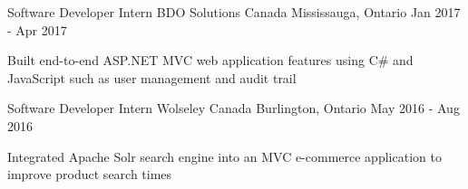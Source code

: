 \begin{cventries}
  \cventry
    {Software Developer Intern} %
    {BDO Solutions Canada} %
    {Mississauga, Ontario} %
    {Jan 2017 - Apr 2017} %
    {
      \begin{cvitems} %
        \item {Built end-to-end ASP.NET MVC web application features using C\# and JavaScript such as user management and audit trail}
      \end{cvitems}
    }

  \cventry
    {Software Developer Intern} %
    {Wolseley Canada} %
    {Burlington, Ontario} %
    {May 2016 - Aug 2016} %
    {
      \begin{cvitems} %
        \item {Integrated Apache Solr search engine into an MVC e-commerce application to improve product search times}
      \end{cvitems}
    }

\end{cventries}
